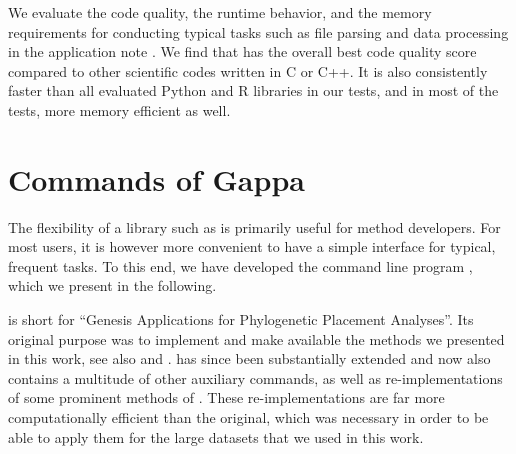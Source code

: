 We evaluate the code quality, the runtime behavior, and the memory requirements
for conducting typical tasks such as file parsing and data processing in the application note \cite{Czech2019-genesis-gappa}.
We find that  has the overall best code quality score compared to other scientific codes written in C or C++.
It is also consistently faster than all evaluated Python and R libraries in our tests,
and in most of the tests, more memory efficient as well.




\section{Commands of Gappa}
\label{ch:PipelineImplementation:sub:Commands}


The flexibility of a library such as  is primarily useful for method developers.
For most users, it is however more convenient to have a simple interface for typical, frequent tasks.
To this end, we have developed the command line program , which we present in the following.

 is short for ``Genesis Applications for Phylogenetic Placement Analyses''.
Its original purpose was to implement and make available the methods we presented in this work,
see also  and .
 has since been substantially extended and 
now also contains a multitude of other auxiliary commands,
as well as re-implementations of some prominent methods of  \cite{Matsen2010}.
These re-implementations are far more computationally efficient than the original,
which was necessary in order to be able to apply them for the large datasets that we used in this work.

